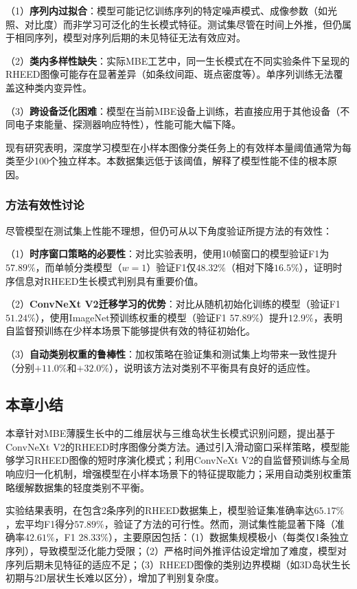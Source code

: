 （1）\textbf{序列内过拟合}：模型可能记忆训练序列的特定噪声模式、成像参数（如光照、对比度）而非学习可泛化的生长模式特征。测试集尽管在时间上外推，但仍属于相同序列，模型对序列后期的未见特征无法有效应对。

（2）\textbf{类内多样性缺失}：实际MBE工艺中，同一生长模式在不同实验条件下呈现的RHEED图像可能存在显著差异（如条纹间距、斑点密度等）。单序列训练无法覆盖这种类内变异性。

（3）\textbf{跨设备泛化困难}：模型在当前MBE设备上训练，若直接应用于其他设备（不同电子束能量、探测器响应特性），性能可能大幅下降。

现有研究表明，深度学习模型在小样本图像分类任务上的有效样本量阈值通常为每类至少100个独立样本。本数据集远低于该阈值，解释了模型性能不佳的根本原因。

\subsubsection{方法有效性讨论}

尽管模型在测试集上性能不理想，但仍可从以下角度验证所提方法的有效性：

（1）\textbf{时序窗口策略的必要性}：对比实验表明，使用10帧窗口的模型验证F1为$57.89\%$，而单帧分类模型（$w=1$）验证F1仅$48.32\%$（相对下降$16.5\%$），证明时序信息对RHEED生长模式判别具有重要价值。

（2）\textbf{ConvNeXt V2迁移学习的优势}：对比从随机初始化训练的模型（验证F1 $51.24\%$），使用ImageNet预训练权重的模型（验证F1 $57.89\%$）提升$12.9\%$，表明自监督预训练在少样本场景下能够提供有效的特征初始化。

（3）\textbf{自动类别权重的鲁棒性}：加权策略在验证集和测试集上均带来一致性提升（分别$+11.0\%$和$+32.0\%$），说明该方法对类别不平衡具有良好的适应性。

\subsection{本章小结}

本章针对MBE薄膜生长中的二维层状与三维岛状生长模式识别问题，提出基于ConvNeXt V2的RHEED时序图像分类方法。通过引入滑动窗口采样策略，模型能够学习RHEED图像的短时序演化模式；利用ConvNeXt V2的自监督预训练与全局响应归一化机制，增强模型在小样本场景下的特征提取能力；采用自动类别权重策略缓解数据集的轻度类别不平衡。

实验结果表明，在包含2条序列的RHEED数据集上，模型验证集准确率达$65.17\%$，宏平均F1得分$57.89\%$，验证了方法的可行性。然而，测试集性能显著下降（准确率$42.61\%$，F1 $28.33\%$），主要原因包括：（1）数据集规模极小（每类仅1条独立序列），导致模型泛化能力受限；（2）严格时间外推评估设定增加了难度，模型对序列后期未见特征的适应不足；（3）RHEED图像的类别边界模糊（如3D岛状生长初期与2D层状生长难以区分），增加了判别复杂度。

